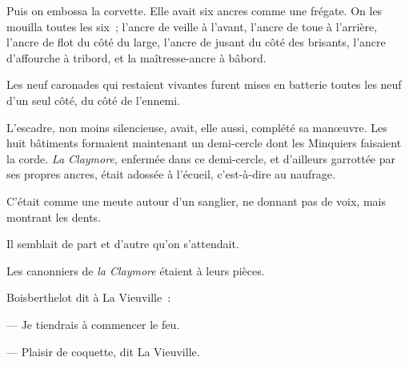 \documentclass[french,twoside]{book} %
\begin{document}
Puis on embossa la corvette. Elle avait six ancres comme une frégate. On les mouilla toutes les six ; l’ancre de veille à l’avant, l’ancre de toue à l’arrière, l’ancre de flot du côté du large, l’ancre de jusant du côté des brisants, l’ancre d’affourche à tribord, et la maîtresse-ancre à bâbord.\par
Les neuf caronades qui restaient vivantes furent mises en batterie toutes les neuf d’un seul côté, du côté de l’ennemi.\par
L’escadre, non moins silencieuse, avait, elle aussi, complété sa manœuvre. Les huit bâtiments formaient maintenant un demi-cercle dont les Minquiers faisaient la corde. \emph{La Claymore,} enfermée dans ce demi-cercle, et d’ailleurs garrottée par ses propres ancres, était adossée à l’écueil, c’est-à-dire au naufrage.\par
C’était comme une meute autour d’un sanglier, ne donnant pas de voix, mais montrant les dents.\par
Il semblait de part et d’autre qu’on s’attendait.\par
Les canonniers de \emph{la Claymore} étaient à leurs pièces.\par
Boisberthelot dit à La Vieuville :\par
— Je tiendrais à commencer le feu.\par
— Plaisir de coquette, dit La Vieuville.
\end{document}
